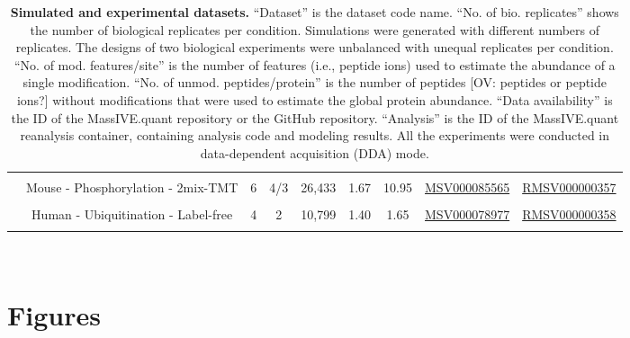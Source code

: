 \documentclass[mcp]{article}
\numberwithin{table}{section}
\def\todo#1{{\color{red}[#1]}}
\begin{document}
\begin{table}[ht]
\begin{tiny}
\begin{tabular}{|c|c|ccccc|cc|}
&&&&&&&& \\%
& Mouse - Phosphorylation - 2mix-TMT& 6 & 4/3 & 26,433 & 1.67 & 10.95 & \href{https://massive.ucsd.edu/ProteoSAFe/dataset.jsp?task=4878d777c6b34cf8aaf8477e93140c4d}{MSV000085565} & \href{https://massive.ucsd.edu/ProteoSAFe/reanalysis_container.jsp?task=79406d32c1f9413daf7756e6eeb24968}{RMSV000000357}\\
&&&&&&&& \\%
& Human - Ubiquitination - Label-free & 4 & 2 & 10,799 & 1.40 & 1.65 & \href{https://massive.ucsd.edu/ProteoSAFe/dataset.jsp?task=1b516164de5345108b40b75147dd58b5}{MSV000078977} & \href{https://massive.ucsd.edu/ProteoSAFe/reanalysis_container.jsp?task=f9e6117e00794ce5b2e8802601be16bc}{RMSV000000358}\\ [0.02in]
 &&&&&&&& \\
 \hline
\end{tabular}\\
\end{tiny}
\caption{ \small {\bf Simulated and experimental datasets.} 
``Dataset'' is the dataset code name. ``No. of bio. replicates'' shows the number of biological replicates per condition. Simulations were generated with different numbers of replicates. The designs of two biological experiments were unbalanced with unequal replicates per condition. ``No. of mod. features/site'' is the number of features (i.e., peptide ions) used to estimate the abundance of a single modification. ``No. of unmod. peptides/protein'' is the number of peptides \todo{OV: peptides or peptide ions?} without modifications that were used to estimate the global protein abundance. ``Data availability'' is the ID of the MassIVE.quant repository or the GitHub repository. ``Analysis'' is the ID of the MassIVE.quant reanalysis container, containing analysis code and modeling results. All the experiments were conducted in data-dependent acquisition (DDA) mode. }

\label{tab:dataDescription}
\end{table}

\newpage
\section{Figures}
\end{document}
